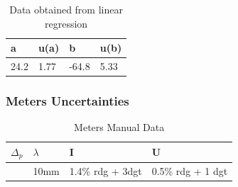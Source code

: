 \begin{table}[H]
	\centering
	\begin{tabular}{l|l|l|l}
		a & u(a)& b  & u(b) \\ \hline
		24.2 & 1.77 & -64.8 & 5.33
		
	\end{tabular}
	\caption{Data obtained from linear regression}
\end{table}

\subsubsection*{Meters Uncertainties}
\begin{table}[!ht]
    \centering
    \begin{tabular}{l|l|l|l}
        $\Delta_p $ & $\lambda$  & I &  U  \\ \hline
        ~ & 10mm & 1.4\% rdg + 3dgt & 0.5\% rdg + 1 dgt \\ 
    \end{tabular}
    \caption{Meters Manual Data}
\end{table}

